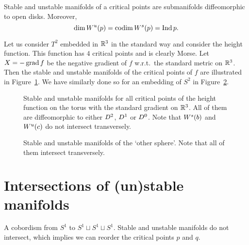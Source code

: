 \begin{prop}
    Stable and unstable manifolds of a critical points are submanifolds diffeomorphic to open disks. Moreover,
    \[
        \dim W^u(p) = \operatorname{codim} W^s(p) = \operatorname{Ind} p
    .\] 
\end{prop}

\begin{eg}
    Let us consider $T^{2}$ embedded in $\mathbb{R}^3$ in the standard way and consider the height function. 
    This function has $4$ critical points and is clearly Morse.
    Let $X = -\operatorname{grad} f$ be the negative gradient of $f$ w.r.t.\ the standard metric on $\mathbb{R}^{3}$.
    Then the stable and unstable manifolds of the critical points of $f$ are illustrated in Figure~\ref{fig:torus-height-function-stable-and-unstable-manifolds}.
    \label{eg:torus-stable-unstable-manifolds-standard-gradient}
    We have similarly done so for an embedding of $S^2$ in Figure~\ref{fig:other-sphere-definition-of-mathcal-m}.
\end{eg}

    \begin{figure}[H]
        \centering
        \caption{
        Stable and unstable manifolds for all critical points of the height function on the torus with the standard gradient on $\mathbb{R}^3$.
    All of them are diffeomorphic to either $D^{2}$, $D^{1}$ or  $D^{0}$.
    Note that $W^s(b)$ and  $W^u(c)$ do not intersect transversely.
}
        \label{fig:torus-height-function-stable-and-unstable-manifolds}
    \end{figure}

    \begin{figure}[H]
        \centering
        \caption{
            Stable and unstable manifolds of the `other sphere'. Note that all of them intersect transversely.
        }
        \label{fig:other-sphere-definition-of-mathcal-m}
    \end{figure}


    \section{Intersections of (un)stable manifolds}

    \begin{marginfigure}
        \centering
        \caption{
            A cobordism from $S^{1}$ to $S^{1} \sqcup S^1 \sqcup S^1$.
            Stable and unstable manifolds do not intersect, which implies we can reorder the critical points $p$ and $q$.
        }
        \label{fig:when-can-we-attach-multiple-handles-at-the-same-time}
    \end{marginfigure}

